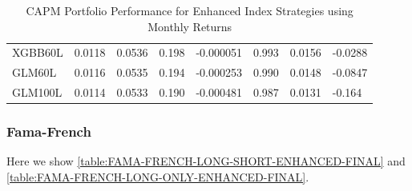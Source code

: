 \begin{table}[H]
\begin{tabularx}{\textwidth}{Xlllllll}
XGBB60L & 0.0118 & 0.0536 & 0.198 & -0.000051 & 0.993 & \cellcolor{lightlightgreen}0.0156 & -0.0288 \\
GLM60L & 0.0116 & 0.0535 & 0.194 & -0.000253 & 0.990 & \cellcolor{lightlightgreen}0.0148 & -0.0847 \\
GLM100L & 0.0114 & 0.0533 & 0.190 & -0.000481 & 0.987 & \cellcolor{lightlightgreen}0.0131 & -0.164 \\
\bottomrule
\end{tabularx}
\vspace{1em}
\caption{CAPM Portfolio Performance for Enhanced Index Strategies using Monthly Returns}
\label{tab:new-performance-enhanced-index-return-sigma-sharpe-alpha-beta-te-ir}
\end{table}



\subsubsection{Fama-French}

Here we show \autoref{table:FAMA-FRENCH-LONG-SHORT-ENHANCED-FINAL} and \autoref{table:FAMA-FRENCH-LONG-ONLY-ENHANCED-FINAL}.

